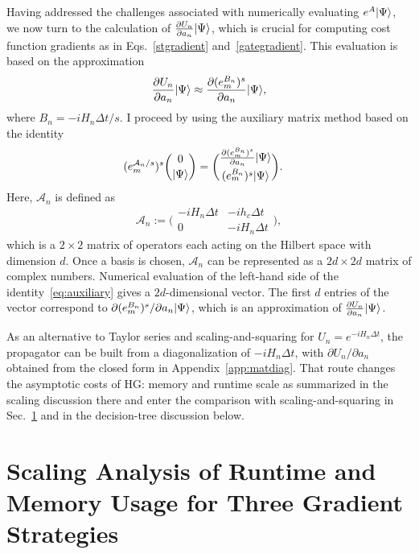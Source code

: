 Having addressed the challenges associated with numerically evaluating $e^A|\Psi\rangle$, we now turn to the calculation of $\frac{\partial U_n}{\partial a_n} |\Psi\rangle$, which is crucial for computing cost function gradients as in Eqs.~\eqref{stgradient} and~\eqref{gategradient}. This evaluation is based on the approximation 
\begin{align}
    \frac{\partial U_n}{\partial a_n} |\Psi\rangle\approx \frac{\partial (e^{B_n}_m)^s}{\partial a_n} |\Psi\rangle,
\end{align}
where $B_n={-iH_n\Delta t}/{s}$. I proceed by using the auxiliary matrix method based on the identity~\cite{auxigoodwin2015auxiliary,najfeld1995derivatives}
\begin{equation}
\label{eq:auxiliary}
    \begin{aligned}
    (e^{\mathcal{A}_n/s}_m)^s
    \binom{0}{|\Psi\rangle}&=
    \binom{
    \frac{\partial (e^{B_{n}}_m)^s}{\partial a_n}  |\Psi\rangle}{{(e^{B_n}_m)^s|\Psi\rangle}}.
\end{aligned}
\end{equation}
Here, $\mathcal{A}_n$ is defined as
\begin{equation}
\mathcal{A}_n:=
{\biggl(\begin{matrix}
-iH_n \Delta t& -ih_c\Delta t \\
0 & -iH_n\Delta t
\end{matrix}\biggr)},
\end{equation}
which is a $2\times2$ matrix of operators each acting on the Hilbert space with dimension $d$. Once a basis is chosen, $\mathcal{A}_n$ can be represented as a $2d\times2d$ matrix of complex numbers. Numerical evaluation of the left-hand side of the identity~\eqref{eq:auxiliary} gives a $2d$-dimensional vector. The first $d$ entries of the vector correspond to $\partial (e^{B_n}_m)^s / \partial a_n |\Psi\rangle$, which is an approximation of $\frac{\partial U_n}{\partial a_n} |\Psi\rangle$.

As an alternative to Taylor series and scaling-and-squaring for $U_n=e^{-iH_n\Delta t}$, the propagator can be built from a diagonalization of $-iH_n\Delta t$, with $\partial U_n/\partial a_n$ obtained from the closed form in Appendix~\ref{app:matdiag}. That route changes the asymptotic costs of HG: memory and runtime scale as summarized in the scaling discussion there and enter the comparison with scaling-and-squaring in Sec.~\ref{sec:scaling-analysis} and in the decision-tree discussion below.

\section{Scaling Analysis of Runtime and Memory Usage for Three Gradient Strategies}
\label{sec:scaling-analysis}

